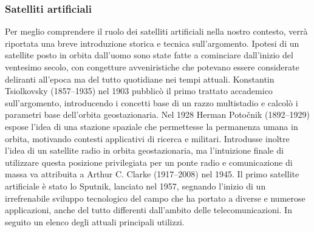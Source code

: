 \documentclass[a4paper]{article}
\begin{document}
			\subsubsection{Satelliti artificiali}
			Per meglio comprendere il ruolo dei satelliti artificiali nella nostro contesto, verrà riportata una breve introduzione storica e tecnica sull'argomento. Ipotesi di un satellite posto in orbita dall'uomo sono state fatte a cominciare dall'inizio del ventesimo secolo, con congetture avveniristiche che potevano essere considerate deliranti all'epoca ma del tutto quotidiane nei tempi attuali. Konstantin Tsiolkovsky (1857–1935) nel 1903 pubblicò il primo trattato accademico sull'argomento, introducendo i concetti base di un razzo multistadio e calcolò i parametri base dell'orbita geostazionaria. Nel 1928 Herman Potočnik (1892–1929) espose l'idea di una stazione spaziale che permettesse la permanenza umana in orbita, motivando contesti applicativi di ricerca e militari. Introdusse inoltre l'idea di un satellite radio in orbita geostazionaria, ma l'intuizione finale di utilizzare questa posizione privilegiata per un ponte radio e comunicazione di massa va attribuita a Arthur C. Clarke (1917–2008) nel 1945. Il primo satellite artificiale è stato lo Sputnik, lanciato nel 1957, segnando l'inizio di un irrefrenabile sviluppo tecnologico del campo che ha portato a diverse e numerose applicazioni, anche del tutto differenti dall'ambito delle telecomunicazioni. In seguito un elenco degli attuali principali utilizzi.
\end{document}
